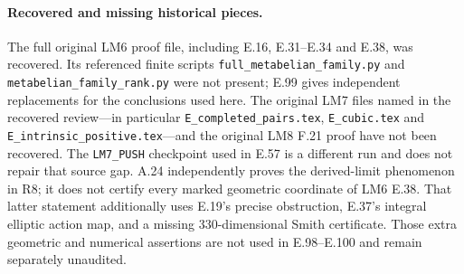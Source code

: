 \paragraph{Recovered and missing historical pieces.}
The full original LM6 proof file, including E.16, E.31--E.34 and
E.38, was recovered.  Its referenced finite scripts
\texttt{full\_metabelian\_family.py} and
\texttt{metabelian\_family\_rank.py} were not present; E.99 gives
independent replacements for the conclusions used here.  The original
LM7 files named in the recovered review---in particular
\texttt{E\_completed\_pairs.tex}, \texttt{E\_cubic.tex} and
\texttt{E\_intrinsic\_positive.tex}---and the original LM8 F.21
proof have not been recovered.  The \texttt{LM7\_PUSH} checkpoint
used in E.57 is a different run and does not repair that source gap.
A.24 independently proves the derived-limit phenomenon in R8; it
does not certify every marked geometric coordinate of LM6 E.38.
That latter statement additionally uses E.19's precise obstruction,
E.37's integral elliptic action map, and a missing 330-dimensional
Smith certificate.  Those extra geometric and numerical assertions
are not used in E.98--E.100 and remain separately unaudited.
